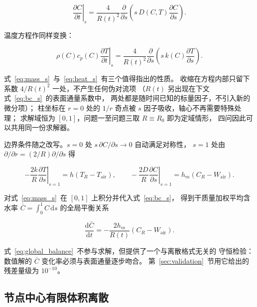 \begin{equation}
\left.\frac{\partial C}{\partial t}\right|_{s}
=\frac{4}{R(t)^{2}}\frac{\partial}{\partial s}
\left(s\,D(C,T)\frac{\partial C}{\partial s}\right).
\label{eq:mass_s}
\end{equation}

温度方程作同样变换：

\begin{equation}
\rho(C)c_p(C)\left.\frac{\partial T}{\partial t}\right|_{s}
=\frac{4}{R(t)^{2}}\frac{\partial}{\partial s}
\left(s\,k(C)\frac{\partial T}{\partial s}\right).
\label{eq:heat_s}
\end{equation}

式~\eqref{eq:mass_s}~与~\eqref{eq:heat_s}~有三个值得指出的性质。
收缩在方程内部只留下系数 $4/R(t)^2$ 一处，不产生任何伪对流项
（$R(t)$ 另出现在下文式~\eqref{eq:bc_s}~的表面通量系数中，
两处都是随时间已知的标量因子，不引入新的微分项）；
柱坐标在 $r=0$ 处的 $1/r$ 奇点被 $s$ 因子吸收，轴心不再需要特殊处理；
求解域恒为 $[0,1]$，问题一至问题三取 $R\equiv R_0$ 即为定域情形，
四问因此可以共用同一份求解器。

边界条件随之改写。$s=0$ 处 $s\,\partial C/\partial s\to0$ 自动满足对称性，
$s=1$ 处由 $\partial/\partial r=(2/R)\partial/\partial s$ 得

\begin{equation}
-\frac{2k}{R}\left.\frac{\partial T}{\partial s}\right|_{s=1}
=h\left(T_R-T_{\mathrm{air}}\right),
\qquad
-\frac{2D}{R}\left.\frac{\partial C}{\partial s}\right|_{s=1}
=h_m\left(C_R-W_{\mathrm{air}}\right).
\label{eq:bc_s}
\end{equation}

对式~\eqref{eq:mass_s}~在 $[0,1]$ 上积分并代入式~\eqref{eq:bc_s}，
得到干质量加权平均含水率 $\bar C=\int_0^1C\,\mathrm{d}s$ 的全局平衡关系

\begin{equation}
\frac{\mathrm{d}\bar C}{\mathrm{d}t}
=-\frac{2h_m}{R(t)}\left(C_R-W_{\mathrm{air}}\right).
\label{eq:global_balance}
\end{equation}

式~\eqref{eq:global_balance}~不参与求解，但提供了一个与离散格式无关的
守恒检验：数值解的 $\bar C$ 变化率必须与表面通量逐步吻合。
第~\ref{sec:validation}~节用它给出的残差量级为 $10^{-10}$。

\subsection{节点中心有限体积离散}


